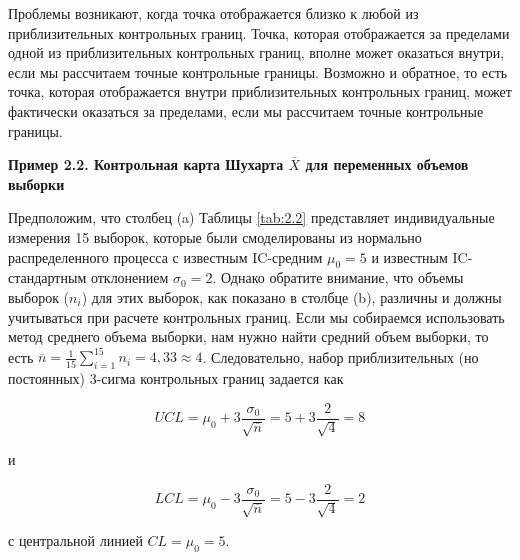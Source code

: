 Проблемы возникают, когда точка отображается близко к любой из приблизительных контрольных границ. Точка, которая отображается за пределами одной из приблизительных контрольных границ, вполне может оказаться внутри, если мы рассчитаем точные контрольные границы. Возможно и обратное, то есть точка, которая отображается внутри приблизительных контрольных границ, может фактически оказаться за пределами, если мы рассчитаем точные контрольные границы.

\noindent\textbf{Пример 2.2. Контрольная карта Шухарта \(\overline{X}\) для переменных объемов выборки}

Предположим, что столбец (a) Таблицы \ref{tab:2.2} представляет индивидуальные измерения 15 выборок, которые были смоделированы из нормально распределенного процесса с известным IC-средним \(\mu_0 = 5\) и известным IC-стандартным отклонением \(\sigma_0 = 2\). Однако обратите внимание, что объемы выборок (\(n_i\)) для этих выборок, как показано в столбце (b), различны и должны учитываться при расчете контрольных границ. Если мы собираемся использовать метод среднего объема выборки, нам нужно найти средний объем выборки, то есть \(\overline{n} = \frac{1}{15}\sum_{i=1}^{15} n_i = 4,33 \approx 4\). Следовательно, набор приблизительных (но постоянных) 3-сигма контрольных границ задается как

\[
UCL = \mu_0 + 3\frac{\sigma_0}{\sqrt{\overline{n}}} = 5 + 3\frac{2}{\sqrt{4}} = 8
\]

и

\[
LCL = \mu_0 - 3\frac{\sigma_0}{\sqrt{\overline{n}}} = 5 - 3\frac{2}{\sqrt{4}} = 2
\]

с центральной линией \(CL = \mu_0 = 5\).

